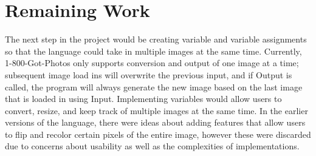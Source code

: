 \documentclass{article}
\begin{document}
\section{Remaining Work}
The next step in the project would be creating variable and variable assignments so that the language could take in multiple images at the same time. Currently, 1-800-Got-Photos only supports conversion and output of one image at a time; subsequent image load ins will overwrite the previous input, and if Output is called, the program will always generate the new image based on the last image that is loaded in using Input. Implementing variables would allow users to convert, resize, and keep track of multiple images at the same time. In the earlier versions of the language, there were ideas about adding features that allow users to flip and recolor certain pixels of the entire image, however these were discarded due to concerns about usability as well as the complexities of implementations. 
\end{document}
